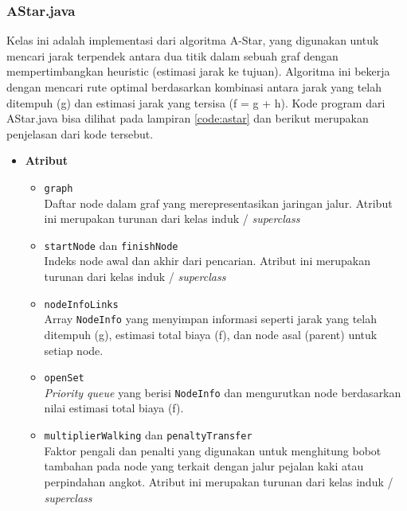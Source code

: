 \subsubsection{AStar.java}
Kelas ini adalah implementasi dari algoritma A-Star, yang digunakan untuk mencari jarak terpendek antara dua titik dalam sebuah graf dengan mempertimbangkan heuristic (estimasi jarak ke tujuan). Algoritma ini bekerja dengan mencari rute optimal berdasarkan kombinasi antara jarak yang telah ditempuh (g) dan estimasi jarak yang tersisa (f = g + h). Kode program dari AStar.java bisa dilihat pada lampiran \ref{code:astar} dan berikut merupakan penjelasan dari kode tersebut.
\begin{itemize}
    \item \textbf{Atribut}
    \begin{itemize}
        \item \texttt{graph}
        \\ Daftar node dalam graf yang merepresentasikan jaringan jalur. Atribut ini merupakan turunan dari kelas induk / \textit{superclass}
        \item \texttt{startNode} dan \texttt{finishNode}
        \\ Indeks node awal dan akhir dari pencarian. Atribut ini merupakan turunan dari kelas induk / \textit{superclass}
        \item \texttt{nodeInfoLinks}
        \\ Array \texttt{NodeInfo} yang menyimpan informasi seperti jarak yang telah ditempuh (g), estimasi total biaya (f), dan node asal (parent) untuk setiap node.
        \item \texttt{openSet}
        \\ \textit{Priority queue} yang berisi \texttt{NodeInfo} dan mengurutkan node berdasarkan nilai estimasi total biaya (f).
        \item \texttt{multiplierWalking} dan \texttt{penaltyTransfer}
        \\ Faktor pengali dan penalti yang digunakan untuk menghitung bobot tambahan pada node yang terkait dengan jalur pejalan kaki atau perpindahan angkot. Atribut ini merupakan turunan dari kelas induk / \textit{superclass}
    \end{itemize}


\end{itemize}
